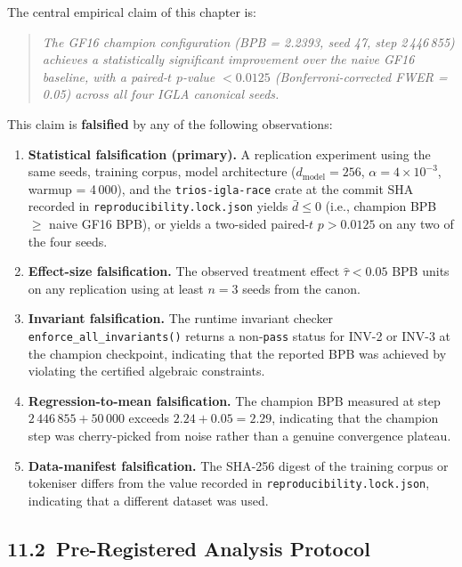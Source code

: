 The central empirical claim of this chapter is:

\begin{quotation}
\noindent
\textit{The GF16 champion configuration (BPB = 2.2393, seed 47, step 2\,446\,855)
achieves a statistically significant improvement over the naive GF16
baseline, with a paired-\(t\) \(p\)-value \(< 0.0125\) (Bonferroni-corrected
FWER = 0.05) across all four IGLA canonical seeds.}
\end{quotation}

\noindent
This claim is \textbf{falsified} by any of the following observations:

\begin{enumerate}
\item \textbf{Statistical falsification (primary).}
  A replication experiment using the same seeds, training corpus,
  model architecture (\(d_{\text{model}} = 256\), \(\alpha = 4\times10^{-3}\),
  warmup = 4\,000), and the \texttt{trios-igla-race} crate at the commit
  SHA recorded in \texttt{reproducibility.lock.json} yields
  \(\bar{d} \leq 0\) (i.e., champion BPB \(\geq\) naive GF16 BPB),
  or yields a two-sided paired-\(t\) \(p > 0.0125\) on any
  two of the four seeds.

\item \textbf{Effect-size falsification.}
  The observed treatment effect \(\hat\tau < 0.05\) BPB units on any
  replication using at least \(n = 3\) seeds from the canon.

\item \textbf{Invariant falsification.}
  The runtime invariant checker \texttt{enforce\_all\_invariants()} returns
  a non-\texttt{pass} status for INV-2 or INV-3 at the champion checkpoint,
  indicating that the reported BPB was achieved by violating the certified
  algebraic constraints.

\item \textbf{Regression-to-mean falsification.}
  The champion BPB measured at step \(2\,446\,855 + 50\,000\) exceeds
  \(2.24 + 0.05 = 2.29\), indicating that the champion step was
  cherry-picked from noise rather than a genuine convergence plateau.

\item \textbf{Data-manifest falsification.}
  The SHA-256 digest of the training corpus or tokeniser differs from
  the value recorded in \texttt{reproducibility.lock.json}, indicating
  that a different dataset was used.
\end{enumerate}

\subsection{11.2\ Pre-Registered Analysis Protocol}


